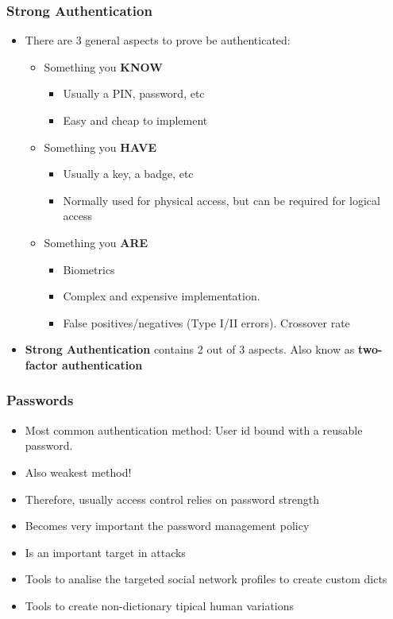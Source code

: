 \documentclass{beamer}
\begin{document}
\begin{frame}
\frametitle{Strong Authentication}

\begin{itemize}

\item There are 3 general aspects to prove be authenticated:

\begin{itemize}
  \item Something you {\bf KNOW}
    \begin{itemize}
    \item Usually a PIN, password, etc
    \item Easy and cheap to implement
    \end{itemize}
  \item Something you {\bf HAVE}
    \begin{itemize}
    \item Usually a key, a badge, etc
    \item Normally used for physical access, but can be required for logical access
    \end{itemize}
  \item Something you {\bf ARE}
    \begin{itemize}
    \item Biometrics
    \item Complex and expensive implementation.
    \item False positives/negatives (Type I/II errors). Crossover rate
    \end{itemize}
\end{itemize}

\item {\bf Strong Authentication} contains 2 out of 3 aspects. Also know as {\bf two-factor authentication}

\end{itemize}

\end{frame}

\begin{frame}

\frametitle{Passwords}

\begin{itemize}
\item Most common authentication method: User id bound with a reusable password.
\item Also weakest method!
\item Therefore, usually access control relies on password strength
\item Becomes very important the password management policy
\item Is an important target in attacks
\item Tools to analise the targeted social network profiles to create custom dicts
\item Tools to create non-dictionary tipical human variations
\end{itemize}

\end{frame}
\end{document}
